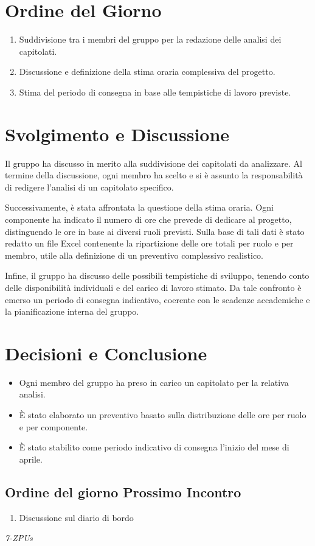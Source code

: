 \documentclass[a4paper,12pt]{article}
\begin{document}
\section{Ordine del Giorno}
\begin{enumerate}
    \item Suddivisione tra i membri del gruppo per la redazione delle analisi dei capitolati.
    \item Discussione e definizione della stima oraria complessiva del progetto.
    \item Stima del periodo di consegna in base alle tempistiche di lavoro previste.
\end{enumerate}
\vspace{0.5cm}
\section{Svolgimento e Discussione}
Il gruppo ha discusso in merito alla suddivisione dei capitolati da analizzare. Al termine della discussione, ogni membro ha scelto e si è assunto la responsabilità di redigere l’analisi di un capitolato specifico.

Successivamente, è stata affrontata la questione della stima oraria. Ogni componente ha indicato il numero di ore che prevede di dedicare al progetto, distinguendo le ore in base ai diversi ruoli previsti. Sulla base di tali dati è stato redatto un file Excel contenente la ripartizione delle ore totali per ruolo e per membro, utile alla definizione di un preventivo complessivo realistico.

Infine, il gruppo ha discusso delle possibili tempistiche di sviluppo, tenendo conto delle disponibilità individuali e del carico di lavoro stimato. Da tale confronto è emerso un periodo di consegna indicativo, coerente con le scadenze accademiche e la pianificazione interna del gruppo.

\vspace{0.5cm}
\section{Decisioni e Conclusione}
\begin{itemize}
    \item Ogni membro del gruppo ha preso in carico un capitolato per la relativa analisi.
    \item È stato elaborato un preventivo basato sulla distribuzione delle ore per ruolo e per componente.
    \item È stato stabilito come periodo indicativo di consegna l’inizio del mese di aprile.
\end{itemize}

\subsection{Ordine del giorno Prossimo Incontro}
\begin{enumerate}
    \item Discussione sul diario di bordo
\end{enumerate}

\vfill
\begin{flushright}
    \textit{7-ZPUs}
\end{flushright}
\end{document}
